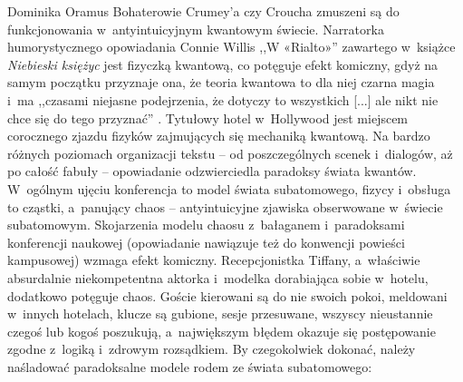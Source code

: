 \begin{artplenv}{Dominika Oramus}
Bohaterowie Crumey’a czy Croucha zmuszeni są do funkcjonowania w~antyintuicyjnym kwantowym świecie. Narratorka humorystycznego opowiadania Connie Willis ,,W «Rialto»'' zawartego w~książce \textit{Niebieski księżyc}
\parencite*[][]{willis_niebieski_2010} %
 jest fizyczką kwantową, co potęguje efekt komiczny, gdyż na samym początku przyznaje ona, że teoria kwantowa to dla niej czarna magia i~ma ,,czasami niejasne podejrzenia, że dotyczy to wszystkich [...] ale nikt nie chce się do tego przyznać'' 
\parencite[][s.~9]{willis_niebieski_2010}. %
 Tytułowy hotel w~Hollywood jest miejscem corocznego zjazdu fizyków zajmujących się mechaniką kwantową. Na bardzo różnych poziomach organizacji tekstu -- od poszczególnych scenek i~dialogów, aż po całość fabuły -- opowiadanie odzwierciedla paradoksy świata kwantów. W~ogólnym ujęciu konferencja to model świata subatomowego, fizycy i~obsługa to cząstki, a~panujący chaos -- antyintuicyjne zjawiska obserwowane w~świecie subatomowym. Skojarzenia modelu chaosu z~bałaganem i~paradoksami konferencji naukowej (opowiadanie nawiązuje też do konwencji powieści kampusowej) wzmaga efekt komiczny. Recepcjonistka Tiffany, a~właściwie absurdalnie niekompetentna aktorka i~modelka dorabiająca sobie w~hotelu, dodatkowo potęguje chaos. Goście kierowani są do nie swoich pokoi, meldowani w~innych hotelach, klucze są gubione, sesje przesuwane, wszyscy nieustannie czegoś lub kogoś poszukują, a~największym błędem okazuje się postępowanie zgodne z~logiką i~zdrowym rozsądkiem. By czegokolwiek dokonać, należy naśladować paradoksalne modele rodem ze świata subatomowego:



\end{artplenv}
